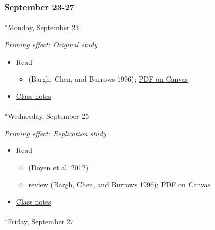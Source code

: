 \documentclass[
  letterpaper,
  DIV=11,
  numbers=noendperiod]{scrartcl}
\makeatletter
\let\oldparagraph\paragraph
\renewcommand{\paragraph}{
    \@ifstar
      \xxxParagraphStar
      \xxxParagraphNoStar
  }
\newcommand{\xxxParagraphStar}[1]{\oldparagraph*{#1}\mbox{}}
\newcommand{\xxxParagraphNoStar}[1]{\oldparagraph{#1}\mbox{}}
\providecommand{\tightlist}{%
  \setlength{\itemsep}{0pt}\setlength{\parskip}{0pt}}\usepackage{longtable,booktabs,array}
\makeatother
\begin{document}
\subsubsection*{September 23-27}\label{week-05}

\paragraph*{Monday, September 23}\label{monday-september-23}

\emph{Priming effect: Original study}

\begin{itemize}
\tightlist
\item
  Read

  \begin{itemize}
  \tightlist
  \item
    (Bargh, Chen, and Burrows 1996);
    \href{https://psu.instructure.com/courses/2350148/files/folder/readings?preview=165170715}{PDF
    on Canvas}
  \end{itemize}
\item
  \href{notes/wk05-2024-09-23-priming.qmd}{Class notes}
\end{itemize}

\paragraph*{Wednesday, September 25}\label{wednesday-september-25}

\emph{Priming effect: Replication study}

\begin{itemize}
\tightlist
\item
  Read

  \begin{itemize}
  \tightlist
  \item
    (Doyen et al. 2012)
  \item
    review (Bargh, Chen, and Burrows 1996);
    \href{https://psu.instructure.com/courses/2350148/files/folder/readings?preview=165170715}{PDF
    on Canvas}
  \end{itemize}
\item
  \href{notes/wk05-2024-09-25-priming-replication.qmd}{Class notes}
\end{itemize}

\paragraph*{Friday, September 27}\label{friday-september-27}
\end{document}

